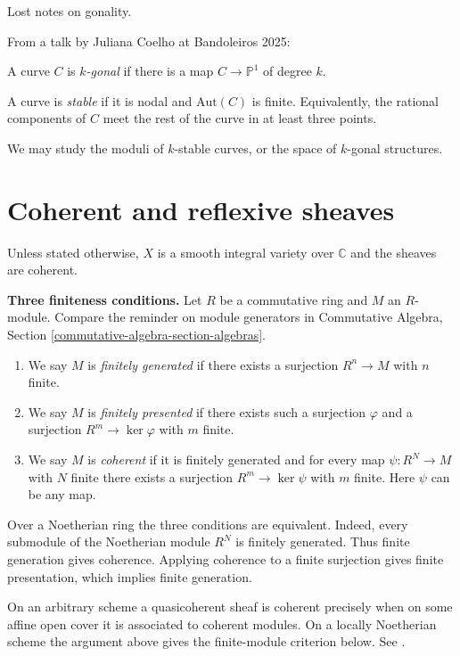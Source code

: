 \medskip\noindent
Lost notes on gonality.

\noindent
From a talk by Juliana Coelho at Bandoleiros
2025:

A curve $C$ is {\it $k$-gonal} if there is a
map $C \to \mathbb{P}^1$ of degree $k$.

A curve is {\it stable} if it is nodal and
$\text{Aut}(C)$ is finite.
Equivalently, the rational components of $C$
meet the
rest of the curve in at least three points.

We may study the moduli of $k$-stable curves,
or the space of $k$-gonal structures.

\section{Coherent and reflexive sheaves}
\label{section-coherent-reflexive-sheaves}

Unless stated otherwise, $X$ is a smooth
integral variety over $\mathbb{C}$ and
the sheaves are coherent.

\medskip\noindent
\textbf{Three finiteness conditions.}
Let $R$ be a commutative ring and $M$ an
$R$-module. Compare the reminder on module
generators in Commutative Algebra, Section
\ref{commutative-algebra-section-algebras}.
\begin{enumerate}
\item
We say $M$ is \emph{finitely generated} if
there exists a surjection $R^n\to M$ with $n$
finite.
\item
We say $M$ is \emph{finitely presented} if
there exists such a surjection $\varphi$ and
a surjection $R^m\to\ker\varphi$ with $m$
finite.
\item
We say $M$ is \emph{coherent} if it is
finitely generated and for every map
$\psi:R^N\to M$ with $N$ finite there exists
a surjection $R^m\to\ker\psi$ with $m$
finite. Here $\psi$ can be any map.
\end{enumerate}

Over a Noetherian ring the three conditions
are equivalent. Indeed, every submodule of
the Noetherian module $R^N$ is finitely
generated. Thus finite generation gives
coherence. Applying coherence to a finite
surjection gives finite presentation, which
implies finite generation.

On an arbitrary scheme a quasicoherent sheaf
is coherent precisely when on some affine
open cover it is associated to coherent
modules. On a locally Noetherian scheme the
argument above gives the finite-module
criterion below. See
\cite[Definitions 8.6.1--8.6.2]%
{vanEkerenHomologicalAlgebra2026}.

